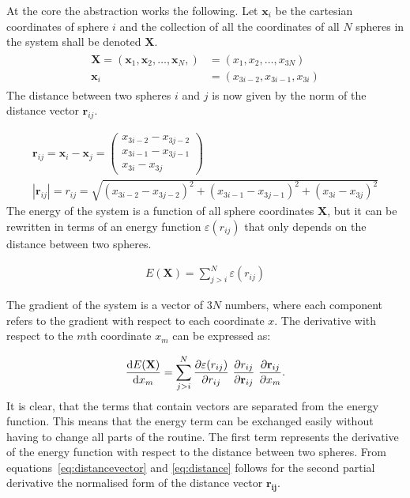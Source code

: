 At the core the abstraction works the following. Let $\mathbf{x}_i$ be the
cartesian coordinates of sphere $i$ and the collection of all the coordinates
of all $N$ spheres in the system shall be denoted $\mathbf{X}$.
%
\begin{align}
    \begin{aligned}
        \mathbf{X}=(\mathbf{x}_1,\mathbf{x}_2,\ldots,\mathbf{x}_N,)&=(x_1,x_2,\ldots,x_{3N}) \\
            \mathbf{x}_i &= (x_{3i-2},x_{3i-1},x_{3i})
    \end{aligned}
\end{align}%
%
The distance between two spheres $i$ and $j$ is now given by the norm of the
distance vector $\mathbf{r}_{ij}$.

\begin{align}
    \mathbf{r}_{ij}=\mathbf{x}_i-\mathbf{x}_j=
    \begin{pmatrix}
        x_{3i-2} - x_{3j-2}\\
        x_{3i-1} - x_{3j-1}\\
        x_{3i} - x_{3j}
    \end{pmatrix}\label{eq:distancevector}\\
    |\mathbf{r}_{ij}|=r_{ij}=\sqrt{(x_{3i-2} - x_{3j-2})^2 + (x_{3i-1} - x_{3j-1})^2 + (x_{3i} - x_{3j})^2}\label{eq:distance}
\end{align}
%
The energy of the system is a function of all sphere coordinates $\mathbf{X}$,
but it can be rewritten in terms of an energy function $\varepsilon(r_{ij})$ that only depends on the
distance between two spheres.

\begin{align}
    E(\mathbf{X})=\sum_{j>i}^N\varepsilon(r_{ij})
\end{align}%
%

The gradient of the system is a vector of $3N$ numbers, where each component
refers to the gradient with respect to each coordinate $x$. The derivative with
respect to the $m$th coordinate $x_m$ can be expressed as:

\begin{align}
    \dv{E(\mathbf{X})}{x_m}=\sum_{j>i}^N\pdv{\varepsilon(r_{ij})}{r_{ij}}\ \pdv{r_{ij}}{\mathbf{r}_{ij}}\ \pdv{\mathbf{r}_{ij}}{x_m}.\label{eq:gradientcomponent}
\end{align}%
%
It is clear, that the terms that contain vectors are separated from the energy
function. This means that the energy term can be exchanged easily without
having to change all parts of the routine. The first term represents the
derivative of the energy function with respect to the distance between two
spheres. From equations~\eqref{eq:distancevector} and \eqref{eq:distance}
follows for the second partial derivative the normalised form of the distance
vector $\mathbf{r_{ij}}$.

